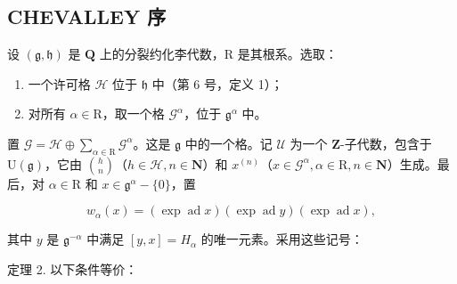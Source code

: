 \subsection{CHEVALLEY 序}

设 \((\mathfrak{g},\mathfrak{h})\) 是 \(\mathbf{Q}\) 上的分裂约化李代数，\(\mathrm{R}\) 是其根系。选取：

\begin{enumerate}
\def\labelenumi{\alph{enumi})}
\item
  一个许可格 \(\mathcal{H}\) 位于 \(\mathfrak{h}\) 中（第 6 号，定义 1）；
\item
  对所有 \(\alpha \in \mathrm{R}\)，取一个格 \(\mathcal{G}^{\alpha}\)，位于 \(\mathfrak{g}^{\alpha}\) 中。
\end{enumerate}

置 \(\mathcal{G} = \mathcal{H} \oplus \sum_{\alpha \in \mathrm{R}} \mathcal{G}^{\alpha}\)。这是 \(\mathfrak{g}\) 中的一个格。记 \(\mathcal{U}\) 为一个 \(\mathbf{Z}\)-子代数，包含于 \(\mathrm{U}(\mathfrak{g})\)，它由 \(\binom{h}{n}\)（\(h \in \mathcal{H}, n \in \mathbf{N}\)）和 \(x^{(n)}\)（\(x \in \mathcal{G}^{\alpha}, \alpha \in \mathrm{R}, n \in \mathbf{N}\)）生成。最后，对 \(\alpha \in \mathrm{R}\) 和 \(x \in \mathfrak{g}^{\alpha} - \{0\}\)，置

\[
w _ {\alpha} (x) = (\exp \operatorname{ad} x) (\exp \operatorname{ad} y) (\exp \operatorname{ad} x),
\]

其中 \(y\) 是 \(\mathfrak{g}^{-\alpha}\) 中满足 \([y,x] = H_{\alpha}\) 的唯一元素。采用这些记号：

定理 2. 以下条件等价：

